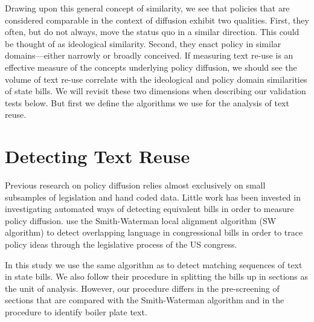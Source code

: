 \documentclass[12pt]{article} %
\begin{document}
Drawing upon this general concept of similarity, we see that policies that are considered comparable in the context of diffusion exhibit two qualities. First, they often, but do not always, move the status quo in a similar direction. This could be thought of as ideological similarity. Second, they enact policy in similar domains---either narrowly or broadly conceived. If measuring text re-use is an effective measure of the concepts underlying policy diffusion, we should see the volume of text re-use correlate with the ideological and policy domain similarities of state bills. We will revisit these two dimensions when describing our validation tests below. But first we define the algorithms we use for the analysis of text reuse. 






\section{Detecting Text Reuse}



Previous research on policy diffusion relies almost exclusively on small subsamples of legislation and hand coded data. Little work has been invested in investigating automated ways of detecting equivalent bills in order to measure policy diffusion. 
\citet{wilkerson2015tracing} use the Smith-Waterman local alignment algorithm (SW algorithm) \citep{smith1981identification} to detect overlapping language in congressional bills in order to trace policy ideas through the legislative process of the US congress. 

In this study we use the same algorithm as \citet{wilkerson2015tracing} to detect matching sequences of text in state bills. We also follow their procedure in splitting the bills up in sections as the unit of analysis. However, our procedure differs in the pre-screening of sections that are compared with the Smith-Waterman algorithm and in the procedure to identify boiler plate text.
\end{document}
